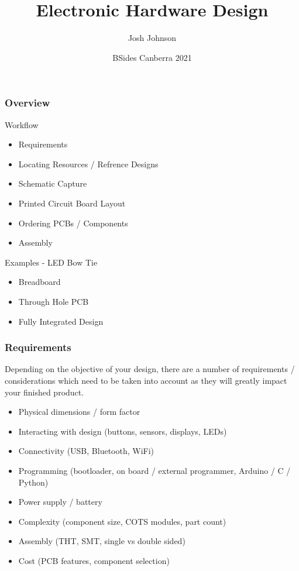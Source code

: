 \documentclass[aspectratio=169, t]{beamer}
\title[Electronic Hardware Design]{Electronic Hardware Design}
\author{Josh Johnson}
\date{BSides Canberra 2021}
\begin{document}
\begin{frame}
\titlepage
\end{frame}

\begin{frame}
\frametitle{Overview}
Workflow
\begin{itemize}
	\item Requirements
	\item Locating Resources / Refrence Designs
	\item Schematic Capture
	\item Printed Circuit Board Layout
	\item Ordering PCBs / Components
	\item Assembly
\end{itemize}
Examples - LED Bow Tie
\begin{itemize}
	\item Breadboard
	\item Through Hole PCB
	\item Fully Integrated Design
\end{itemize}
\end{frame}

\begin{frame}
\frametitle{Requirements}
Depending on the objective of your design, there are a number of requirements / considerations which need to be taken into account as they will greatly impact your finished product. \\[10pt]

\begin{itemize}
	\item Physical dimensions / form factor
	\item Interacting with design (buttons, sensors, displays, LEDs)
	\item Connectivity (USB, Bluetooth, WiFi)
	\item Programming (bootloader, on board / external programmer, Arduino / C / Python)
	\item Power supply / battery
	\item Complexity (component size, COTS modules, part count)
	\item Assembly (THT, SMT, single vs double sided)
	\item Cost (PCB features, component selection)
\end{itemize}
\end{frame}
\end{document}
